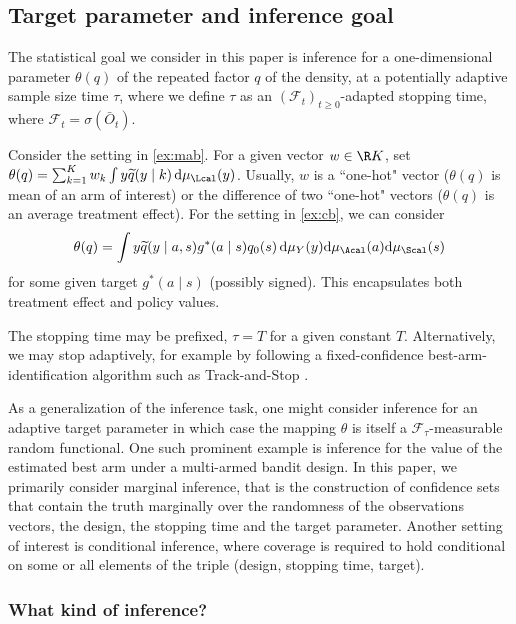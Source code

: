 \subsection{Target parameter and inference goal}
The statistical goal we consider in this paper is inference for a one-dimensional parameter $\theta(q)$ of the repeated factor $q$ of the density, at a potentially adaptive sample size time $\tau$, where we define $\tau$ as an $(\mathcal{F}_t)_{t \geq 0}$-adapted stopping time, where $\mathcal{F}_t = \sigma(\bar{O}_t)$. 

\begin{example}Consider the setting in \cref{ex:mab}. For a given vector $w\in\R K$, set $\theta(q)=\sum_{k=1}^Kw_k\int y\widetilde q(y\mid k)\,\mathrm{d}\mu_\Lcal(y)$. Usually, $w$ is a ``one-hot" vector ($\theta(q)$ is mean of an arm of interest) or the difference of two ``one-hot" vectors ($\theta(q)$ is an average treatment effect). For the setting in \cref{ex:cb}, we can consider 
\begin{align}\label{eq:policy value}\theta(q)=\int y \widetilde q(y\mid a,s)g^*(a\mid s)q_0(s)\,\mathrm{d}\mu_Y(y)\mathrm{d}\mu_\Acal(a)\mathrm{d}\mu_\Scal(s)\end{align} 
for some given target $g^*(a\mid s)$ (possibly signed). This encapsulates both treatment effect and policy values.

The stopping time may be prefixed, $\tau=T$ for a given constant $T$. Alternatively, we may stop adaptively, for example by following a fixed-confidence best-arm-identification algorithm such as Track-and-Stop \citep{garivier2016optimal}.
\end{example}

As a generalization of the inference task, one might consider inference for an adaptive target parameter in which case the mapping $\theta$ is itself a $\mathcal{F}_\tau$-measurable random functional. One such prominent example is inference for the value of the estimated best arm under a multi-armed bandit design. In this paper, we primarily consider marginal inference, that is the construction of confidence sets that contain the truth marginally over the randomness of the observations vectors, the design, the stopping time and the target parameter. Another setting of interest is conditional inference, where coverage is required to hold conditional on some or all elements of the triple (design, stopping time, target).


\subsubsection{What kind of inference?}

